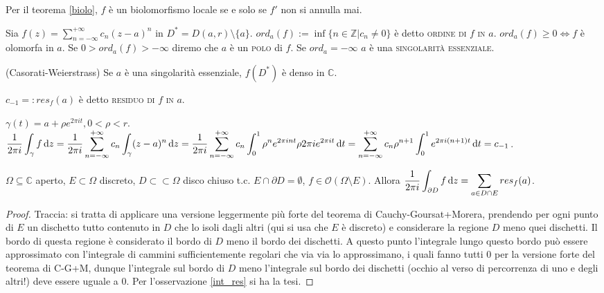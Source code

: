 Per il teorema \ref{biolo}, $f$ è un biolomorfismo locale se e solo se $f'$ non si annulla mai.

\begin{defn}
  Sia $\displaystyle f(z)=\sum_{n=-\infty}^{+\infty} c_n(z-a)^n$ in $D^*=D(a, r) \setminus \{a\}$. $ord_a(f):=\inf\{n \in \mathbb{Z} | c_n \not=0\}$ è detto \textsc{ordine di $f$ in $a$}. $ord_a(f) \ge 0 \Leftrightarrow f$ è olomorfa in $a$.
  Se $0>ord_a(f)>-\infty$ diremo che $a$ è un \textsc{polo} di $f$. Se $ord_a=-\infty$ $a$ è una \textsc{singolarità essenziale}.
\end{defn}

\begin{thm}
  (Casorati-Weierstrass) Se $a$ è una singolarità essenziale, $f(D^*)$ è denso in $\mathbb{C}$.
\end{thm}

\begin{defn}
  $c_{-1}=:res_f(a)$ è detto \textsc{residuo di $f$ in $a$}.
\end{defn}

\begin{oss} \label{int_res}
  $\gamma(t)=a+\rho e^{2\pi i t}, 0<\rho<r$. \\
  $\displaystyle \frac{1}{2\pi i} \int_{\gamma} f \mathop{}\!\mathrm{d} z=\frac{1}{2\pi i} \sum_{n=-\infty}^{+\infty} c_n \int_{\gamma} (z-a)^n \mathop{}\!\mathrm{d} z= \\ \frac{1}{2\pi i} \sum_{n=-\infty}^{+\infty} c_n \int_0^1 \rho^ne^{2\pi i n t} \rho 2 \pi i e^{2\pi i t} \mathop{}\!\mathrm{d} t=\sum_{n=-\infty}^{+\infty} c_n \rho^{n+1} \int_0^1 e^{2\pi i (n+1)t} \mathop{}\!\mathrm{d} t=c_{-1}$.
\end{oss}

\begin{prop}
  $\Omega \subseteq \mathbb{C}$ aperto, $E \subset \Omega$ discreto, $D \subset \subset \Omega$ disco chiuso t.c. $E \cap \partial D=\emptyset$, $f\in \mathcal{O}(\Omega \setminus E)$.
  Allora $\displaystyle \frac{1}{2\pi i}\int_{\partial D} f \mathop{}\!\mathrm{d} z=\sum_{a \in D \cap E} res_f(a)$.
\end{prop}

\begin{proof}
  Traccia: si tratta di applicare una versione leggermente più forte del teorema di Cauchy-Goursat+Morera, prendendo per ogni punto di $E$ un dischetto tutto contenuto in $D$ che lo isoli dagli altri (qui si usa che $E$ è discreto) e considerare la regione $D$ meno quei dischetti. Il bordo di questa regione è considerato il bordo di $D$ meno il bordo dei dischetti. A questo punto l'integrale lungo questo bordo può essere approssimato con l'integrale di cammini sufficientemente regolari che via via lo approssimano, i quali fanno tutti $0$ per la versione forte del teorema di C-G+M, dunque l'integrale sul bordo di $D$ meno l'integrale sul bordo dei dischetti (occhio al verso di percorrenza di uno e degli altri!) deve essere uguale a $0$. Per l'osservazione \ref{int_res} si ha la tesi.
\end{proof}
